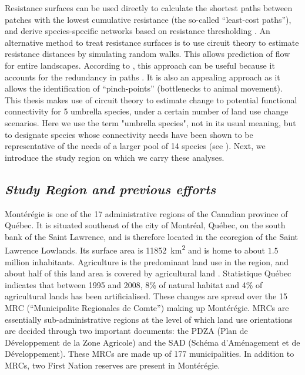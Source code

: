 \documentclass[12pt,Bold,TexShade]{thesis/mcgilletdclass}
\begin{document}
{Resistance surfaces can be used directly to calculate the shortest paths between patches with the lowest cumulative resistance (the so-called “least-cost paths”), and derive species-specific networks based on resistance thresholding \citep{lechner_characterising_2017}. An alternative method to treat resistance surfaces is to use circuit theory to estimate resistance distances by simulating random walks. This allows prediction of flow for entire landscapes. According to \cite{fletcher_spatial_2018}, this approach can be useful because it accounts for the redundancy in paths \citep{mcrae_isolation_2006, mcrae_mcrae_2008}. It is also an appealing approach as it allows the identification of “pinch-points” (bottlenecks to animal movement). \\

This thesis makes use of circuit theory to estimate change to potential functional connectivity for 5 umbrella species, under a certain number of land use change scenarios. Here we use the term "umbrella species", not in its usual meaning, but to designate species whose connectivity needs have been shown to be representative of the needs of a larger pool of 14 species (see \cite{albert_applying_2017, meurant_selecting_2018}). Next, we introduce the study region on which we carry these analyses. \\ \vspace{2em}

\subsection*{\textit{Study Region and previous efforts \\ \vspace{1em}}}

Montérégie is one of the 17 administrative regions of the Canadian province of Québec. It is situated southeast of the city of Montréal, Québec, on the south bank of the Saint Lawrence, and is therefore located in the ecoregion of the Saint Lawrence Lowlands. Its surface area is \SI{11852}{\km\squared} and is home to about $1.5$ million inhabitants. Agriculture is the predominant land use in the region, and about half of this land area is covered by agricultural land \citep{isq_quebec_2020}. Statistique Québec indicates that between 1995 and 2008, 8\% of natural habitat and 4\% of agricultural lands has been artificialised. These changes are spread over the 15 MRC (“Municipalite Regionales de Comte”) making up Montérégie. MRCs are essentially sub-administrative regions at the level of which land use orientations are decided through two important documents: the PDZA (Plan de Développement de la Zone Agricole) and the SAD (Schéma d'Aménagement et de Développement). These MRCs are made up of 177 municipalities. In addition to MRCs, two First Nation reserves are present in Montérégie. \\

}
\end{document}
